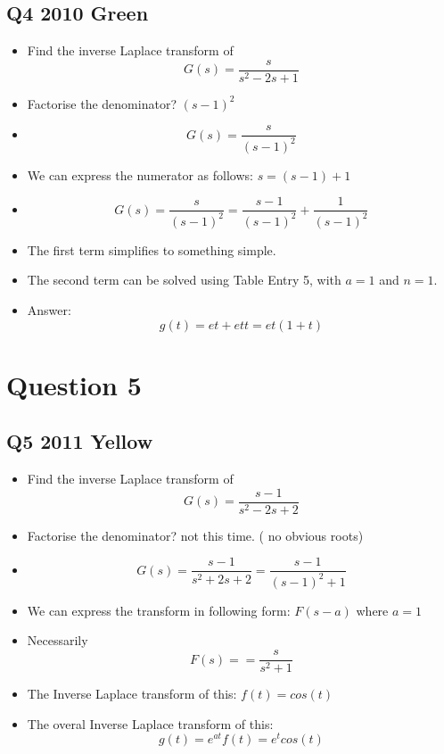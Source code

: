 \documentclass[11pt,a4paper,titlepage,oneside,openany]{article}
\numberwithin{equation}{section}
\numberwithin{algorithm}{section}
\numberwithin{figure}{section}
\numberwithin{table}{section}
\begin{document}
\subsection*{Q4 2010 Green}
\begin{itemize}
\item Find the inverse Laplace transform of
\[ G(s) = \frac{s}{s^2 -2s + 1} \]
\item Factorise the denominator?  $(s-1)^2$
\item
\[ G(s) = \frac{s}{(s-1)^2} \]
\item We can express the numerator as follows:  $s = (s-1)+1$
\item
\[ G(s) = \frac{s}{(s-1)^2} =  \frac{s-1}{(s-1)^2} + \frac{1}{(s-1)^2} \]
\item The first term simplifies to something simple.
\item The second term can be solved using Table Entry 5, with $a=1$ and $n=1$.
\item Answer:
\[ g(t)  = e{t} + e{t}t = e{t}(1+t)  \]

\end{itemize}

\newpage
\section*{Question 5}
\subsection*{Q5 2011 Yellow}
\begin{itemize}
\item Find the inverse Laplace transform of
\[ G(s) = \frac{s-1}{s^2 - 2s + 2} \]
\item Factorise the denominator?  not this time. ( no obvious roots)
\item
\[ G(s) = \frac{s-1}{s^2 + 2s + 2} = \frac{s-1}{(s-1)^2 + 1} \]
\item We can express the transform in following form:  $F(s-a)$ where $a=1$
\item Necessarily \[ F(s) = = \frac{s}{s^2 + 1} \]
\item The Inverse Laplace transform of this: $f(t) = cos(t)$
\item The overal Inverse Laplace transform of this: \[g(t) = e^{at}f(t) = e^tcos(t)\]
\end{itemize}
\end{document}
